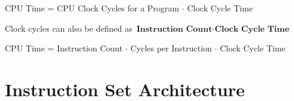 \documentclass[11pt]{article}
\begin{document}
\begin{center}
    CPU Time = CPU Clock Cycles for a Program $\cdot$ Clock Cycle Time
\end{center}

Clock cycles can also be defined as $\textbf{Instruction Count} \cdot \textbf{Clock Cycle Time}$

\begin{center}
    CPU Time = Instruction Count $\cdot$ Cycles per Instruction $\cdot$ Clock Cycle Time
\end{center}

\section{Instruction Set Architecture}
\end{document}
